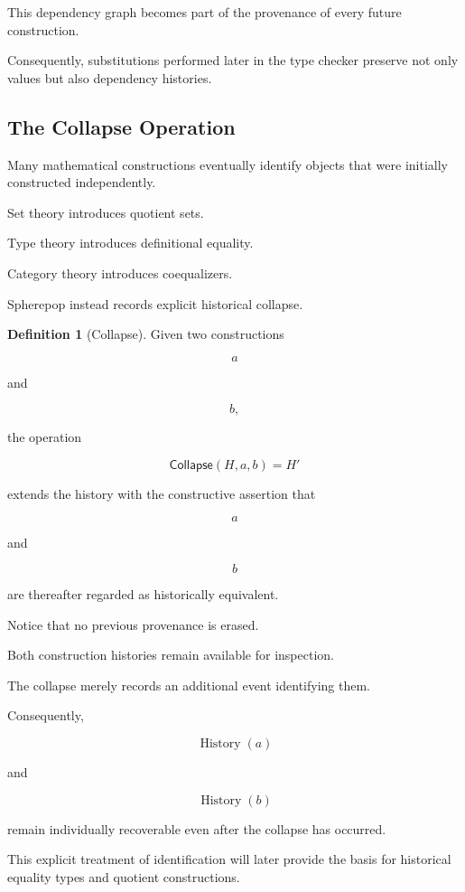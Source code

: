 \documentclass[12pt,oneside]{article}
\theoremstyle{definition}
\newtheorem{definition}[theorem]{Definition}
\theoremstyle{remark}
\newcommand{\Collapse}{\mathsf{Collapse}}
\DeclareMathOperator{\History}{History}
\begin{document}
This dependency graph becomes part of the provenance of every future
construction.

Consequently, substitutions performed later in the type checker preserve not
only values but also dependency histories.

\subsection{The Collapse Operation}

Many mathematical constructions eventually identify objects that were initially
constructed independently.

Set theory introduces quotient sets.

Type theory introduces definitional equality.

Category theory introduces coequalizers.

Spherepop instead records explicit historical collapse.

\begin{definition}[Collapse]

Given two constructions

\[
a
\]

and

\[
b,
\]

the operation

\[
\Collapse(H,a,b)
=
H'
\]

extends the history with the constructive assertion that

\[
a
\]

and

\[
b
\]

are thereafter regarded as historically equivalent.

\end{definition}

Notice that no previous provenance is erased.

Both construction histories remain available for inspection.

The collapse merely records an additional event identifying them.

Consequently,

\[
\History(a)
\]

and

\[
\History(b)
\]

remain individually recoverable even after the collapse has occurred.

This explicit treatment of identification will later provide the basis for
historical equality types and quotient constructions.
\end{document}
